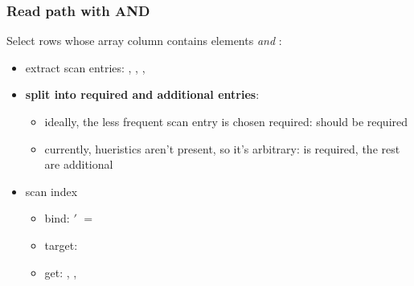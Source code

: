 \begin{frame}
  \frametitle{Read path with AND}
  Select rows whose array column contains elements  \emph{and}
  :

  \pause

  \begin{itemize}
    \item extract scan entries: , , ,
      \pause
    \item \textbf{split into required and additional entries}:
      \pause
      \begin{itemize}
        \item ideally, the less frequent scan entry is chosen required:
           should be required
          \pause
        \item currently, hueristics aren't present, so it's arbitrary:
           is required, the rest are additional
      \end{itemize}
      \pause
    \item scan index
      \begin{itemize}
        \item bind: $'$ $=$ 
        \item target: 
          \pause
        \item get: , , 
      \end{itemize}
  \end{itemize}
\end{frame}

